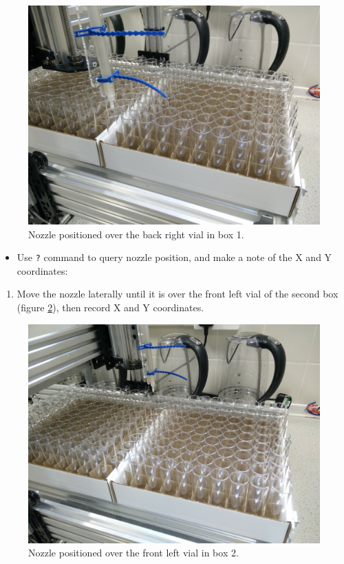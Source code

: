 \documentclass[]{book}
\providecommand{\tightlist}{%
  \setlength{\itemsep}{0pt}\setlength{\parskip}{0pt}}
\theoremstyle{definition}
\theoremstyle{definition}
\theoremstyle{remark}
\begin{document}
\begin{figure}

{\centering \includegraphics[width=0.5\linewidth]{images/box1_last_vial} 

}

\caption{Nozzle positioned over the back right vial in box 1.}\label{fig:box1BackRight}
\end{figure}

\begin{itemize}
\tightlist
\item
  Use \texttt{?} command to query nozzle position, and make a note of
  the X and Y coordinates:
\end{itemize}

\begin{enumerate}
\def\labelenumi{\arabic{enumi}.}
\setcounter{enumi}{6}
\tightlist
\item
  Move the nozzle laterally until it is over the front left vial of the
  second box (figure \ref{fig:box2FrontLeft}), then record X and Y
  coordinates.
\end{enumerate}

\begin{figure}

{\centering \includegraphics[width=0.5\linewidth]{images/box2_first_vial} 

}

\caption{Nozzle positioned over the front left vial in box 2.}\label{fig:box2FrontLeft}
\end{figure}
\end{document}
